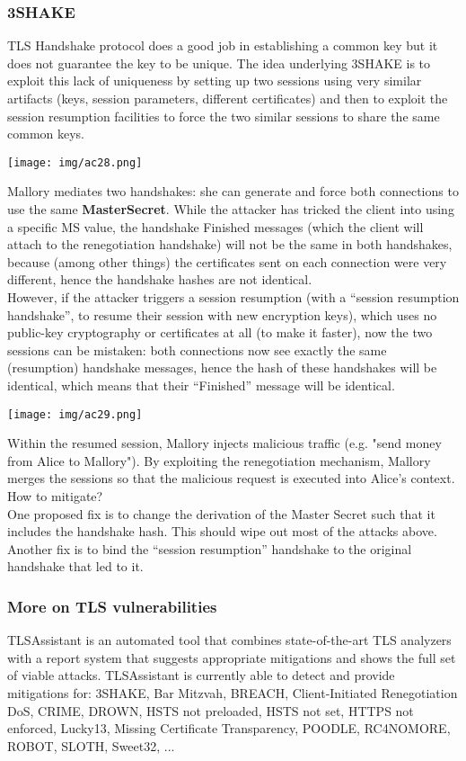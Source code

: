 \documentclass[a4paper, 10pt, titlepage]{article}
\begin{document}
\subsubsection{3SHAKE}
TLS Handshake protocol does a good job in establishing a common key but it does not guarantee the key to be unique. The idea underlying 3SHAKE is to exploit this lack of uniqueness by setting up two sessions using very similar artifacts (keys, session parameters, different certificates) and then to exploit the session resumption facilities to force the two similar sessions to share the same common keys.
\begin{center}
\texttt{[image: img/ac28.png]}
\end{center}
Mallory mediates two handshakes: she can generate and force both connections to use the same \textbf{MasterSecret}. While the attacker has tricked the client into using a specific MS value, the handshake Finished messages (which the client will attach to the renegotiation handshake) will not be the same in both handshakes, because (among other things) the certificates sent on each connection were very different, hence the handshake hashes are not identical. \\
However, if the attacker triggers a session resumption (with a “session resumption handshake”, to resume their session with new encryption keys), which uses no public-key cryptography or certificates at all (to make it faster), now the two sessions can be mistaken: both connections now see exactly the same (resumption) handshake messages, hence the hash of these handshakes will be identical, which means that their “Finished” message will be identical.
\begin{center}
\texttt{[image: img/ac29.png]}
\end{center}
Within the resumed session, Mallory injects malicious traffic (e.g. "send money from Alice to Mallory"). By exploiting the renegotiation mechanism, Mallory merges the sessions so that the malicious request is executed into Alice’s context. How to mitigate? \\
One proposed fix is to change the derivation of the Master Secret such that it includes the handshake hash. This should wipe out most of the attacks above. Another fix is to bind the “session resumption” handshake to the original handshake that led to it.

\subsubsection{More on TLS vulnerabilities}
TLSAssistant is an automated tool that combines state-of-the-art TLS analyzers with a report system that suggests appropriate mitigations and shows the full set of viable attacks. TLSAssistant is currently able to detect and provide mitigations for: 3SHAKE, Bar Mitzvah, BREACH, Client-Initiated Renegotiation DoS, CRIME, DROWN, HSTS not preloaded, HSTS not set, HTTPS not enforced, Lucky13, Missing Certificate Transparency, POODLE, RC4NOMORE, ROBOT, SLOTH, Sweet32, ...
\end{document}
